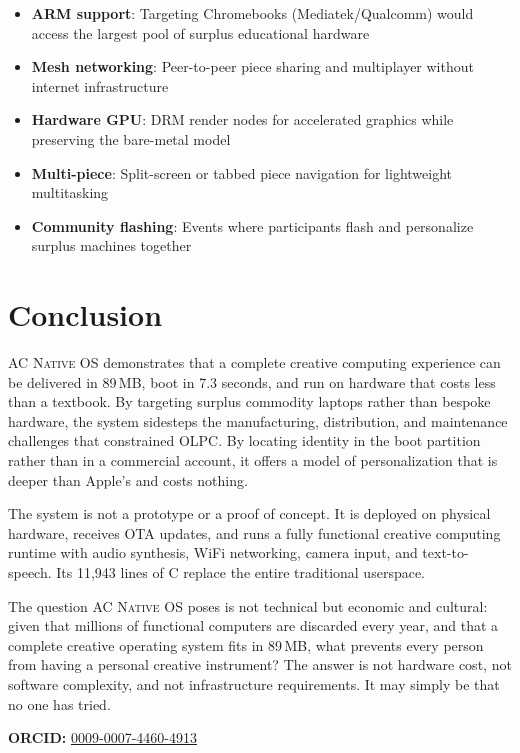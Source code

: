 \documentclass[10pt,letterpaper,twocolumn]{article}
\newcommand{\acos}{\textsc{AC Native OS}}
\begin{document}
\begin{itemize}
  \item \textbf{ARM support}: Targeting Chromebooks (Mediatek/Qualcomm) would access the largest pool of surplus educational hardware
  \item \textbf{Mesh networking}: Peer-to-peer piece sharing and multiplayer without internet infrastructure
  \item \textbf{Hardware GPU}: DRM render nodes for accelerated graphics while preserving the bare-metal model
  \item \textbf{Multi-piece}: Split-screen or tabbed piece navigation for lightweight multitasking
  \item \textbf{Community flashing}: Events where participants flash and personalize surplus machines together
\end{itemize}


\section{Conclusion}

\acos{} demonstrates that a complete creative computing experience can be delivered in 89\,MB, boot in 7.3 seconds, and run on hardware that costs less than a textbook. By targeting surplus commodity laptops rather than bespoke hardware, the system sidesteps the manufacturing, distribution, and maintenance challenges that constrained OLPC. By locating identity in the boot partition rather than in a commercial account, it offers a model of personalization that is deeper than Apple's and costs nothing.

The system is not a prototype or a proof of concept. It is deployed on physical hardware, receives OTA updates, and runs a fully functional creative computing runtime with audio synthesis, WiFi networking, camera input, and text-to-speech. Its 11,943 lines of C replace the entire traditional userspace.

The question \acos{} poses is not technical but economic and cultural: given that millions of functional computers are discarded every year, and that a complete creative operating system fits in 89\,MB, what prevents every person from having a personal creative instrument? The answer is not hardware cost, not software complexity, and not infrastructure requirements. It may simply be that no one has tried.

\vspace{0.5em}
\noindent\textbf{ORCID:} \href{https://orcid.org/0009-0007-4460-4913}{0009-0007-4460-4913}




\end{document}
